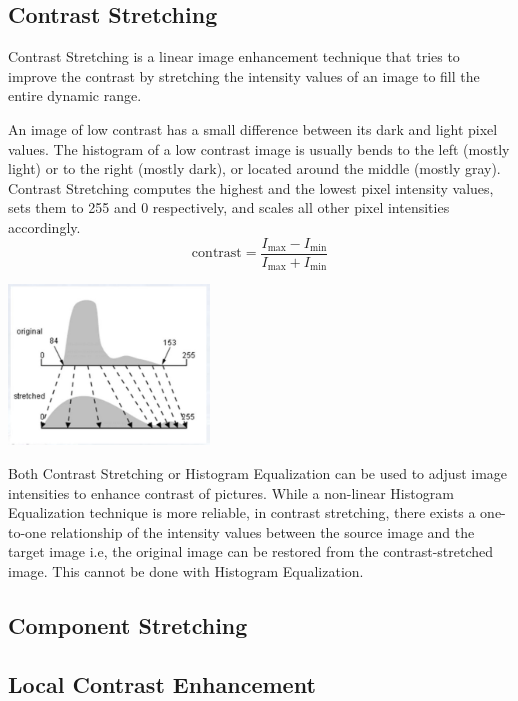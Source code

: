 \documentclass[a4paper,12pt]{article}
\begin{document}
\subsection{Contrast Stretching}
Contrast Stretching is a linear image enhancement technique that tries to
improve the contrast by stretching the intensity values of an image to fill the
entire dynamic range.

An image of low contrast has a small difference between its dark and light
pixel values.  The histogram of a low contrast image is usually bends to the
left (mostly light) or to the right (mostly dark), or located around the middle
(mostly gray).  Contrast Stretching computes the highest and the lowest pixel
intensity values, sets them to 255 and 0 respectively, and scales all other
pixel intensities accordingly.
\[\mathrm{contrast} = \frac{I_\mathrm{max}-I_\mathrm{min}}
                           {I_\mathrm{max}+I_\mathrm{min}}\]

\begin{center}
  \includegraphics[width = 0.40\textwidth]{contrast-mapping.png}
\end{center}

Both Contrast Stretching or Histogram Equalization can be used to adjust image
intensities to enhance contrast of pictures.  While a non-linear Histogram
Equalization technique is more reliable, in contrast stretching, there exists a
one-to-one relationship of the intensity values between the source image and
the target image i.e, the original image can be restored from the
contrast-stretched image.  This cannot be done with Histogram Equalization.

\subsection{Component Stretching}

\subsection{Local Contrast Enhancement}
\end{document}
